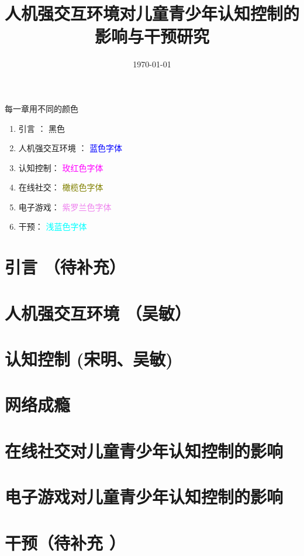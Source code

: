 \documentclass[12pt]{book}
\title{人机强交互环境对儿童青少年认知控制的影响与干预研究}
\date{\today}
\begin{document}
\maketitle

\tableofcontents

\newpage


每一章用不同的颜色
\begin{enumerate}
\item 引言 ：  黑色
\item 人机强交互环境 ： \textcolor{blue}{蓝色字体}
\item 认知控制： \textcolor{magenta}{ 玫红色字体}
\item 在线社交：  \textcolor{olive}{橄榄色字体}
\item 电子游戏： \textcolor{violet}{紫罗兰色字体}
\item 干预：\textcolor{cyan}{ 浅蓝色字体}
\end{enumerate}

\color{black}
\chapter{引言 （待补充）}




\color{black}
\chapter{人机强交互环境 （吴敏）
}



\color{black}
\chapter{认知控制  {(宋明、吴敏)}
}


\color{black}
\chapter{网络成瘾 {}
}




\color{black}
\chapter{在线社交对儿童青少年认知控制的影响}


\color{black}
\chapter{电子游戏对儿童青少年认知控制的影响}


\color{black}
\chapter{干预（待补充 ）}






\end{document}
